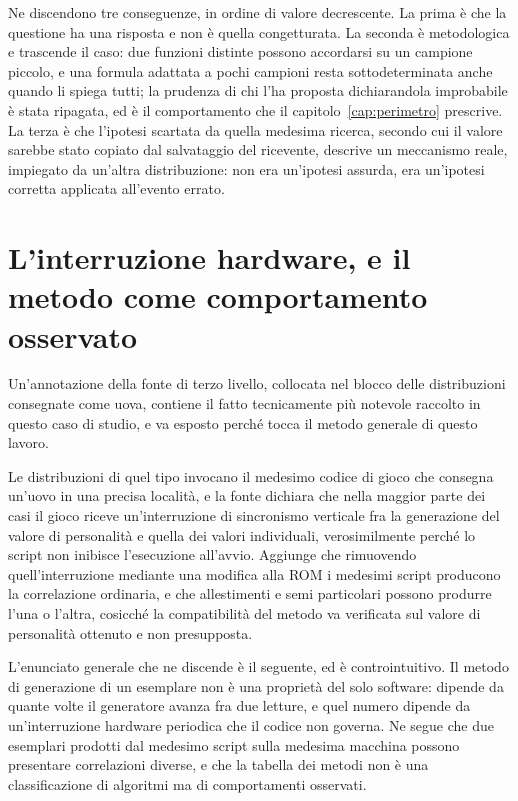 Ne discendono tre conseguenze, in ordine di valore decrescente. La prima è che la questione ha una risposta e non è quella congetturata. La seconda è metodologica e trascende il caso: due funzioni distinte possono accordarsi su un campione piccolo, e una formula adattata a pochi campioni resta sottodeterminata anche quando li spiega tutti; la prudenza di chi l'ha proposta dichiarandola improbabile è stata ripagata, ed è il comportamento che il capitolo~\ref{cap:perimetro} prescrive. La terza è che l'ipotesi scartata da quella medesima ricerca, secondo cui il valore sarebbe stato copiato dal salvataggio del ricevente, descrive un meccanismo reale, impiegato da un'altra distribuzione: non era un'ipotesi assurda, era un'ipotesi corretta applicata all'evento errato.

\section{L'interruzione hardware, e il metodo come comportamento osservato}

Un'annotazione della fonte di terzo livello, collocata nel blocco delle distribuzioni consegnate come uova, contiene il fatto tecnicamente più notevole raccolto in questo caso di studio, e va esposto perché tocca il metodo generale di questo lavoro.

Le distribuzioni di quel tipo invocano il medesimo codice di gioco che consegna un'uovo in una precisa località, e la fonte dichiara che nella maggior parte dei casi il gioco riceve un'interruzione di sincronismo verticale fra la generazione del valore di personalità e quella dei valori individuali, verosimilmente perché lo script non inibisce l'esecuzione all'avvio. Aggiunge che rimuovendo quell'interruzione mediante una modifica alla ROM i medesimi script producono la correlazione ordinaria, e che allestimenti e semi particolari possono produrre l'una o l'altra, cosicché la compatibilità del metodo va verificata sul valore di personalità ottenuto e non presupposta.

L'enunciato generale che ne discende è il seguente, ed è controintuitivo. Il metodo di generazione di un esemplare non è una proprietà del solo software: dipende da quante volte il generatore avanza fra due letture, e quel numero dipende da un'interruzione hardware periodica che il codice non governa. Ne segue che due esemplari prodotti dal medesimo script sulla medesima macchina possono presentare correlazioni diverse, e che la tabella dei metodi non è una classificazione di algoritmi ma di comportamenti osservati.

